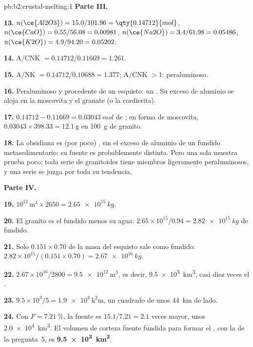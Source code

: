 \begin{solution}{pb:b2:crustal-melting:1}
\noindent\textbf{Parte III.}

\textbf{13.} $n(\ce{Al2O3}) = 15.0/101.96 = \qty{0.14712}{mol}$, $n(\ce{CaO}) =
0.55/56.08 = 0.00981$, $n(\ce{Na2O}) = 3.4/61.98 = 0.05486$, $n(\ce{K2O}) = 4.9/94.20 =
0.05202$.

\textbf{14.} A/CNK $= 0.14712/0.11669 = 1.261$.

\textbf{15.} A/NK $= 0.14712/0.10688 = 1.377$; A/CNK $> 1$: peraluminoso.

\textbf{16.} Peraluminoso y procedente de un esquisto: un . Su exceso de aluminio se aloja en
la moscovita y el granate (o la cordierita).

\textbf{17.} $0.14712 - 0.11669 = \qty{0.03043}{mol}$ de ; en forma de moscovita,
$0.03043\times398.33 = \qty{12.1}{\gram}$ en \qty{100}{\gram} de granito.

\textbf{18.} La obsidiana es (por poco) , sin el exceso de aluminio de un
fundido metasedimentario: su fuente es probablemente distinta. Pero una sola muestra prueba poco:
toda serie de granitoides tiene miembros ligeramente peraluminosos, y una serie se juzga por toda su
tendencia.

\noindent\textbf{Parte IV.}

\textbf{19.} $10^{12}\,\unit{\cubic\metre}\times2650 = \qty{2.65e15}{kg}$.

\textbf{20.} El granito es el fundido menos su agua: $2.65\times10^{15}/0.94 =
\qty{2.82e15}{kg}$ de fundido.

\textbf{21.} Solo $0.151\times0.70$ de la masa del esquisto sale como fundido:
$2.82\times10^{15}/(0.151\times0.70) = \qty{2.67e16}{kg}$.

\textbf{22.} $2.67\times10^{16}/2800 = \qty{9.5e12}{\cubic\metre}$, es decir,
\qty{9.5e3}{\cubic\kilo\metre}, casi diez veces el .

\textbf{23.} $9.5\times10^3/5 = \qty{1.9e3}{\square\kilo\metre}$, un cuadrado de unos
\qty{44}{km} de lado.

\textbf{24.} Con $F = \qty{7.21}{\percent}$, la fuente es $15.1/7.21 = 2.1$ veces
mayor, unos \qty{2.0e4}{\cubic\kilo\metre}. El volumen de corteza fuente fundida para formar
el , con la  de la pregunta~5, es
\textbf{\qty[text-series-to-math=true]{9.5e3}{\cubic\kilo\metre}}.
\end{solution}
